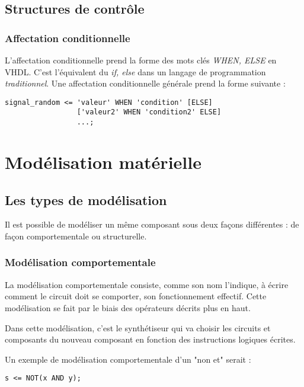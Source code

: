 \documentclass[11.5pt]{report}
\begin{document}
\section{Structures de contrôle}
\subsection{Affectation conditionnelle}
L'affectation conditionnelle prend la forme des mots clés \emph{WHEN, ELSE} en VHDL.
C'est l'équivalent du \emph{if, else} dans un langage de programmation \emph{traditionnel}.
Une affectation conditionnelle générale prend la forme suivante :
\begin{verbatim}
signal_random <= 'valeur' WHEN 'condition' [ELSE]
				 ['valeur2' WHEN 'condition2' ELSE]
				 ...;
\end{verbatim}

\chapter{Modélisation matérielle}
\section{Les types de modélisation}
Il est possible de modéliser un même composant sous deux façons différentes : de façon comportementale ou structurelle.
\subsection{Modélisation comportementale}
La modélisation comportementale consiste, comme son nom l'indique, à écrire comment le circuit doit se comporter, son fonctionnement effectif.
Cette modélisation se fait par le biais des opérateurs décrits plus en haut.
\par
Dans cette modélisation, c'est le synthétiseur qui va choisir les circuits et composants du nouveau composant en fonction des instructions logiques écrites.
\par
Un exemple de modélisation comportementale d'un "non et" serait :
\begin{verbatim}
s <= NOT(x AND y);
\end{verbatim}
\end{document}
